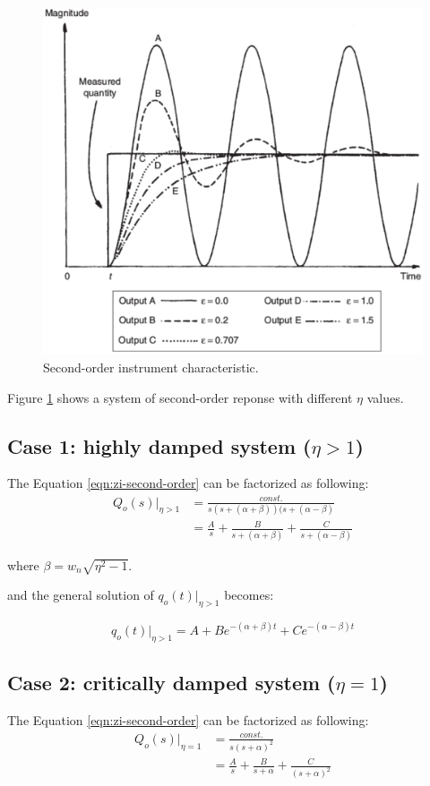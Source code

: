 \documentclass[a4paper,11pt]{book}
\begin{document}
\begin{figure}[h!]\label{fig:second-order}
\centering
  \includegraphics[width=0.7\linewidth]{second-order}
  \caption{Second-order instrument characteristic. } 
\end{figure}

Figure \ref{fig:second-order} shows a system of second-order reponse with different $\eta$ values.

\subsection*{Case 1: highly damped system ($\eta > 1$)}

The Equation \ref{eqn:zi-second-order} can be factorized as following:
\begin{align*}
Q_o(s)|_{\eta>1} &= \frac{const.}{s(s + (\alpha + \beta))(s + (\alpha - \beta)} \\
&= \frac{A}{s} + \frac{B}{s + (\alpha + \beta)} + \frac{C}{s + (\alpha - \beta)}
\end{align*}

where $\beta = w_n\sqrt{\eta^2 - 1}$.

and the general solution of $q_o(t)|_{\eta>1}$ becomes:

\begin{equation}
q_o(t)|_{\eta>1} = A + Be^{-(\alpha+\beta)t}+Ce^{-(\alpha-\beta)t}
\end{equation}

\subsection*{Case 2: critically damped system ($\eta = 1$)}

The Equation \ref{eqn:zi-second-order} can be factorized as following:
\begin{align*}
Q_o(s)|_{\eta=1} &= \frac{const.}{s(s +\alpha)^2} \\
&= \frac{A}{s} + \frac{B}{s + \alpha} + \frac{C}{(s + \alpha)^2}
\end{align*}
\end{document}
